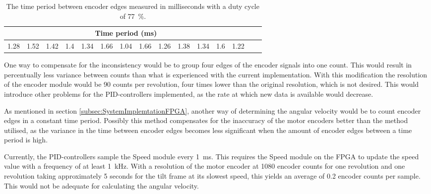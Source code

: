 \documentclass[../../main.tex]{subfiles}
\begin{document}
\begin{table}[H]
    \centering
    \begin{tabular}{c c c c c c c c c c c c c c c}
         \multicolumn{13}{c}{Time period (ms)} \\ \hline
         
         1.28 &
         1.52 &
         1.42 &
         1.4  &
         1.34 &
         1.66 &
         1.04 &
         1.66 &
         1.26 &
         1.38 &
         1.34 &
         1.6  &
         1.22 
       
    \end{tabular}
    \caption{The time period between encoder edges measured in milliseconds with a duty cycle of \SI{77}{\percent}.}
    \label{tab:EncoderDifferenceBetweenEdges}
\end{table}

One way to compensate for the inconsistency would be to group four edges of the encoder signals into one count. This would result in percentually less variance between counts than what is experienced with the current implementation. With this modification the resolution of the encoder module would be 90 counts per revolution, four times lower than the original resolution, which is not desired. This would introduce other problems for the PID-controllers implemented, as the rate at which new data is available would decrease.


As mentioned in section \ref{subsec:SystemImplemtationFPGA}, another way of determining the angular velocity would be to count encoder edges in a constant time period. Possibly this method compensates for the inaccuracy of the motor encoders better than the method utilised, as the variance in the time between encoder edges becomes less significant when the amount of encoder edges between a time period is high. 

Currently, the PID-controllers sample the Speed module every \SI{1}{\milli \second}. This requires the Speed module on the FPGA to update the speed value with a frequency of at least \SI{1}{\kilo\hertz}. With a resolution of the motor encoder at 1080 encoder counts for one revolution and one revolution taking approximately 5 seconds for the tilt frame at its slowest speed, this yields an average of 0.2 encoder counts per sample. This would not be adequate for calculating the angular velocity. 
\end{document}
